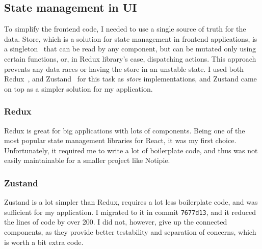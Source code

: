 \subsection{State management in UI}\label{sec:state-management-in-ui}

To simplify the frontend code,
I needed to use a single source of truth for the data.
Store,
which is a solution for state management
in frontend applications,
is a singleton~\cite{gamma_design_1994}
that can be read by any component,
but can be mutated only using certain functions,
or, in Redux library's case, dispatching actions.
This approach prevents any data races
or having the store in an unstable state.
I used both Redux~\cite{gaeraon_redux_2022},
and Zustand~\cite{kato_zustand_2022} for this task
as \textit{store} implementations,
and Zustand came on top as a simpler solution for my application.

\subsubsection{Redux}\label{sec:redux}

Redux is great for big applications with lots of components.
Being one of the most popular state management libraries for React,
it was my first choice.
Unfortunately,
it required me to write a lot of boilerplate code,
and thus was not easily maintainable
for a smaller project like Notipie.

\subsubsection{Zustand}\label{sec:zustand}

Zustand is a lot simpler than Redux,
requires a lot less boilerplate code,
and was sufficient for my application.
I migrated to it in commit
\texttt{7677d13},
and it reduced the lines of code by over 200.
I did not, however, give up the connected components,
as they provide better testability and separation of concerns,
which is worth a bit extra code.

